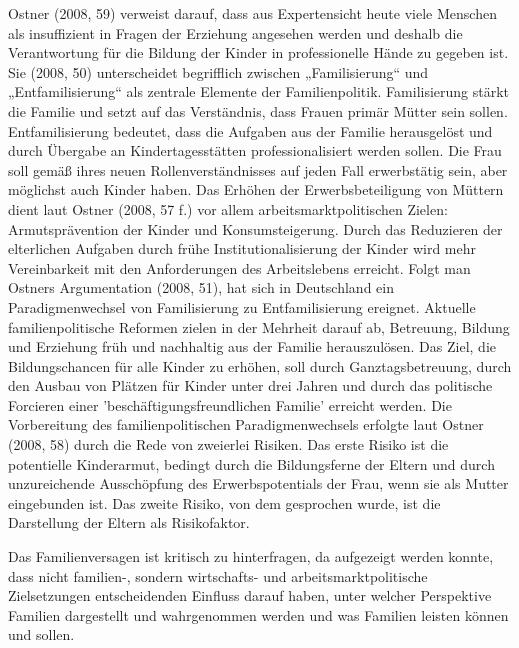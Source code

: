 Ostner (2008, 59) verweist darauf, dass aus Expertensicht heute viele Menschen als insuffizient in Fragen der Erziehung angesehen werden und deshalb die Verantwortung für die Bildung der Kinder in professionelle Hände zu gegeben ist. Sie (2008, 50) unterscheidet begrifflich zwischen „Familisierung“ und „Entfamilisierung“ als zentrale Elemente der Familienpolitik. Familisierung stärkt die Familie und setzt auf das Verständnis, dass Frauen primär Mütter sein sollen. Entfamilisierung bedeutet, dass die Aufgaben aus der Familie herausgelöst und durch Übergabe an Kindertagesstätten professionalisiert werden sollen. Die Frau soll gemäß ihres neuen Rollenverständnisses auf jeden Fall erwerbstätig sein, aber möglichst auch Kinder haben.  
Das Erhöhen der Erwerbsbeteiligung von Müttern dient laut Ostner (2008, 57 f.) vor allem arbeitsmarktpolitischen Zielen: Armutsprävention der Kinder und Konsumsteigerung. 
Durch das Reduzieren der elterlichen Aufgaben durch frühe Institutionalisierung der Kinder wird mehr Vereinbarkeit mit den Anforderungen des Arbeitslebens erreicht. Folgt man Ostners Argumentation (2008, 51), hat sich in Deutschland ein Paradigmenwechsel von Familisierung zu Entfamilisierung ereignet. Aktuelle familienpolitische Reformen zielen in der Mehrheit darauf ab, Betreuung, Bildung und Erziehung früh und nachhaltig aus der Familie herauszulösen. Das Ziel, die Bildungschancen für alle Kinder zu erhöhen, soll durch Ganztagsbetreuung, durch den Ausbau von Plätzen für Kinder unter drei Jahren und durch das politische Forcieren einer 'beschäftigungsfreundlichen Familie' erreicht werden. Die Vorbereitung des familienpolitischen Paradigmenwechsels erfolgte laut Ostner (2008, 58) durch die Rede von zweierlei Risiken. Das erste Risiko ist die potentielle Kinderarmut, bedingt durch die Bildungsferne der Eltern und durch unzureichende Ausschöpfung des Erwerbspotentials der Frau, wenn sie als Mutter eingebunden ist. Das zweite Risiko, von dem gesprochen wurde, ist die Darstellung der Eltern als Risikofaktor.  

Das Familienversagen ist kritisch zu hinterfragen, da aufgezeigt werden konnte, dass nicht familien-, sondern wirtschafts- und arbeitsmarktpolitische Zielsetzungen entscheidenden Einfluss darauf haben, unter welcher Perspektive Familien dargestellt und wahrgenommen werden und was Familien leisten können und sollen.
 

